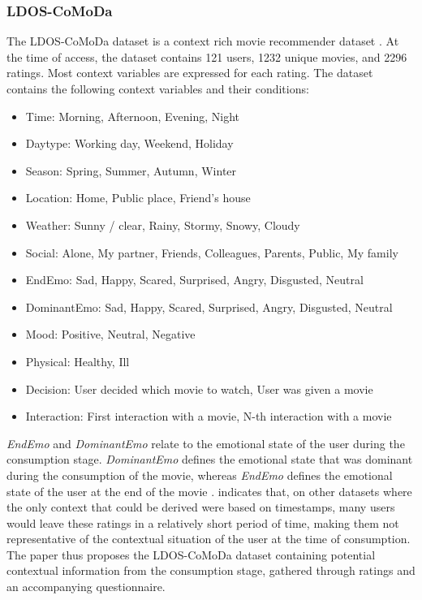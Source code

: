 \subsubsection{LDOS-CoMoDa}
The LDOS-CoMoDa dataset is a context rich movie recommender dataset \cite{comoda}.
At the time of access, the dataset contains 121 users, 1232 unique movies, and 2296 ratings.
Most context variables are expressed for each rating.
The dataset contains the following context variables and their conditions:
\begin{itemize}
    \item Time: Morning, Afternoon, Evening, Night
    \item Daytype: Working day, Weekend, Holiday
    \item Season: Spring, Summer, Autumn, Winter
    \item Location:  Home, Public place, Friend's house
    \item Weather: Sunny / clear, Rainy, Stormy, Snowy, Cloudy
    \item Social: Alone, My partner, Friends, Colleagues, Parents, Public, My family
    \item EndEmo: Sad, Happy, Scared, Surprised, Angry, Disgusted, Neutral
    \item DominantEmo: Sad, Happy, Scared, Surprised, Angry, Disgusted, Neutral
    \item Mood: Positive, Neutral, Negative
    \item Physical: Healthy, Ill
    \item Decision: User decided which movie to watch, User was given a movie
    \item Interaction: First interaction with a movie, N-th interaction with a movie
\end{itemize}
\textit{EndEmo} and \textit{DominantEmo} relate to the emotional state of the user during the consumption stage.
\textit{DominantEmo} defines the emotional state that was dominant during the consumption of the movie, whereas \textit{EndEmo} defines the emotional state of the user at the end of the movie \cite{COMODA2013}.
\cite{COMODA2013} indicates that, on other datasets where the only context that could be derived were based on timestamps, many users would leave these ratings in a relatively short period of time, making them not representative of the contextual situation of the user at the time of consumption.
The paper thus proposes the LDOS-CoMoDa dataset containing potential contextual information from the consumption stage, gathered through ratings and an accompanying questionnaire.
